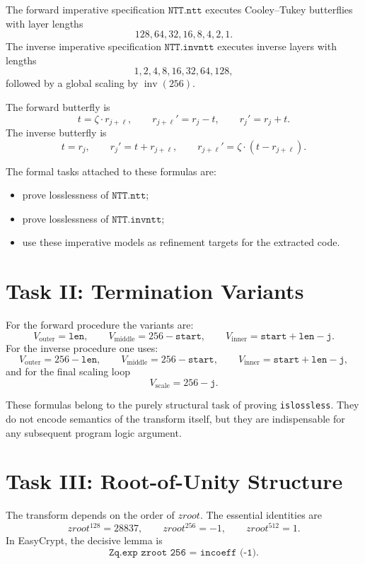\documentclass[11pt]{article}
\begin{document}
The forward imperative specification \(\texttt{NTT.ntt}\) executes
Cooley--Tukey butterflies with layer lengths
\[
128, 64, 32, 16, 8, 4, 2, 1.
\]
The inverse imperative specification \(\texttt{NTT.invntt}\) executes inverse
layers with lengths
\[
1, 2, 4, 8, 16, 32, 64, 128,
\]
followed by a global scaling by \(\operatorname{inv}(256)\).

The forward butterfly is
\[
t = \zeta \cdot r_{j+\ell},\qquad
r_{j+\ell}' = r_j - t,\qquad
r_j' = r_j + t.
\]
The inverse butterfly is
\[
t = r_j,\qquad
r_j' = t + r_{j+\ell},\qquad
r_{j+\ell}' = \zeta \cdot (t - r_{j+\ell}).
\]

The formal tasks attached to these formulas are:
\begin{itemize}
\item prove losslessness of \(\texttt{NTT.ntt}\);
\item prove losslessness of \(\texttt{NTT.invntt}\);
\item use these imperative models as refinement targets for the extracted code.
\end{itemize}

\section{Task II: Termination Variants}

For the forward procedure the variants are:
\[
V_{\mathrm{outer}} = \texttt{len},\qquad
V_{\mathrm{middle}} = 256 - \texttt{start},\qquad
V_{\mathrm{inner}} = \texttt{start} + \texttt{len} - \texttt{j}.
\]
For the inverse procedure one uses:
\[
V_{\mathrm{outer}} = 256 - \texttt{len},\qquad
V_{\mathrm{middle}} = 256 - \texttt{start},\qquad
V_{\mathrm{inner}} = \texttt{start} + \texttt{len} - \texttt{j},
\]
and for the final scaling loop
\[
V_{\mathrm{scale}} = 256 - \texttt{j}.
\]

These formulas belong to the purely structural task of proving
\texttt{islossless}. They do not encode semantics of the transform itself, but
they are indispensable for any subsequent program logic argument.

\section{Task III: Root-of-Unity Structure}

The transform depends on the order of \(zroot\). The essential identities are
\[
zroot^{128} = 28837,
\qquad
zroot^{256} = -1,
\qquad
zroot^{512} = 1.
\]
In EasyCrypt, the decisive lemma is
\[
\texttt{Zq.exp zroot 256 = incoeff (-1)}.
\]
\end{document}
